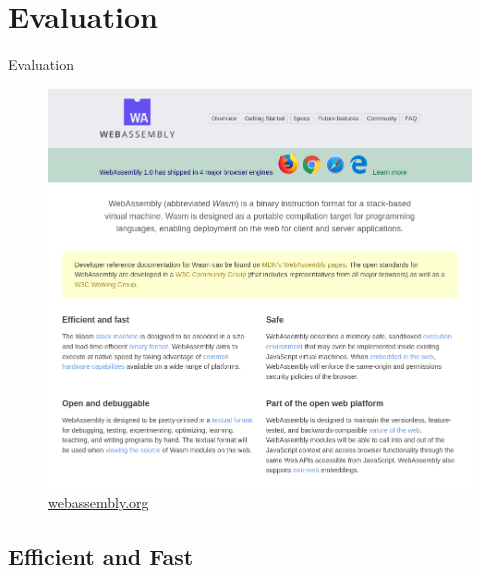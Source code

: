 \documentclass{beamer}
\begin{document}
\section{Evaluation}

\begin{frame}{Evaluation}
    \begin{figure}
        \includegraphics[scale=0.2]{./images/webassembly_org.png}
        \caption{\href{https://webassembly.org/}{webassembly.org}}
    \end{figure}
\end{frame}

\subsection{Efficient and Fast}
\end{document}
